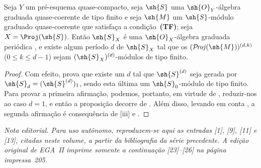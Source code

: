 \documentclass[oneside,10pt]{amsart}
\renewcommand{\leq}{\leqslant}
\def\shProj{\mathcal{P}\!\mathit{roj}}
\newcommand{\oldpage}[2][]{\marginnote{\normalfont\footnotesize\textbf{#1}~|~#2}\ignorespaces}
\let\EGAOriginalLabel\label
\renewcommand{\label}[1]{\phantomsection\EGAOriginalLabel{#1}}
\begin{document}
\begin{proposition}[8.14.14]
\label{II.8.14.14}
Seja $Y$ um pré-esquema quase-compacto, seja $\sh{S}$ uma $\sh{O}_Y$-álgebra graduada quase-coerente de tipo finito e seja $\sh{M}$ um $\sh{S}$-módulo graduado quase-coerente que satisfaça a condição~\textbf{(TF)};
seja $X=\Proj(\sh{S})$.
Então $\sh{S}_X$ é uma $\sh{O}_X$-álgebra graduada periódica , e existe
\oldpage[II]{203}
algum período $d$ de $\sh{S}_X$ tal que os $(\shProj(\sh{M}))^{(d,k)}$ ($0\leq k\leq d-1$) sejam $(\sh{S}_X)^{(d)}$-módulos de tipo finito.
\end{proposition}

\begin{proof}
Com efeito,  prova que existe um $d$ tal que $\sh{S}^{(d)}$ seja gerada por $\sh{S}_d=(\sh{S}^{(d)})_1$, sendo esta última um $\sh{S}_0$-módulo de tipo finito.
Para provar a primeira afirmação, podemos, portanto, em virtude de , reduzir-nos ao caso $d=1$, e então a proposição decorre de .
Além disso, levando em conta , a segunda afirmação é consequência de [iii] e .
\end{proof}
\clearpage
{}
{}
\renewcommand{\refname}{Bibliografia}
\noindent\textit{Nota editorial. Para uso autônomo, reproduzem-se aqui as entradas [1], [9],
[11] e [13], citadas neste volume, a partir da bibliografia da série precedente.
A edição original de EGA~II imprime somente a continuação [23]--[26] na página impressa~205.}
\par\medskip
\end{document}

